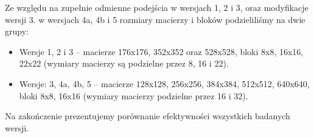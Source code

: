 Ze względu na zupełnie odmienne podejścia w wersjach 1, 2 i 3, oraz modyfikacje wersji 3. w wersjach 4a, 4b i 5 rozmiary macierzy i bloków podzieliliśmy na dwie grupy:
\begin{itemize}
\item Wersje 1, 2 i 3 -- macierze 176x176, 352x352 oraz 528x528, bloki 8x8, 16x16, 22x22 (wymiary macierzy są podzielne przez 8, 16 i 22).
\item Wersje: 3, 4a, 4b, 5  -- macierze 128x128, 256x256, 384x384, 512x512, 640x640, bloki 8x8, 16x16 (wymiary macierzy podzielne przez 16 i 32).
\end{itemize}

Na zakończenie prezentujemy porównanie efektywności wszystkich badanych wersji.

\newpage
